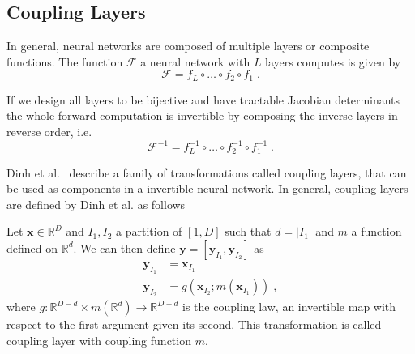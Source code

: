 


\subsection{Coupling Layers}%
\label{sub:coupling_layers}

In general, neural networks are composed of multiple layers or composite
functions. The function $\mathcal{F}$ a neural network with $L$ layers computes
is given by
\begin{equation}%
    \label{eq:neural_network}
    \mathcal{F} = f_L \circ \dots \circ f_2 \circ f_1\;.
\end{equation}

If we design all layers to be bijective and have tractable Jacobian
determinants the whole forward computation is invertible by composing the
inverse layers in reverse order, i.e.
\begin{equation}%
    \label{eq:neural_network_inv}
    \mathcal{F}^{-1} = f_L^{-1} \circ \dots \circ f_2^{-1} \circ f_1^{-1}\;.
\end{equation}

Dinh et al.\ \citep{dinhNICENonlinearIndependent2015} describe a family of transformations
called coupling layers, that can be used as components in a invertible neural
network. In general, coupling layers are defined by Dinh et al. as follows

\begin{definition}
    Let $\mathbf{x} \in \mathbb{R}^D$
    and $I_1, I_2$ a partition of $[1, D]$ such that $d = |I_1|$ and $m$ a
    function defined on $\mathbb{R}^d$. We can then define $\mathbf{y} =
    [\mathbf{y}_{I_1}, \mathbf{y}_{I_2}]$ as
    \begin{equation}
        \begin{aligned}%
            \label{eq:coupling_layer_transform}
            \mathbf{y}_{I_1} &= \mathbf{x}_{I_1} \\
            \mathbf{y}_{I_2} &= g(\mathbf{x}_{I_2};m(\mathbf{x}_{I_1}))\;,
        \end{aligned}
    \end{equation}
    where $g: \mathbb{R}^{D-d} \times m(\mathbb{R}^d) \rightarrow
    \mathbb{R}^{D-d}$ is the coupling law, an invertible map with respect to
    the first argument given its second. This transformation is called coupling
    layer with coupling function $m$.
\end{definition}

